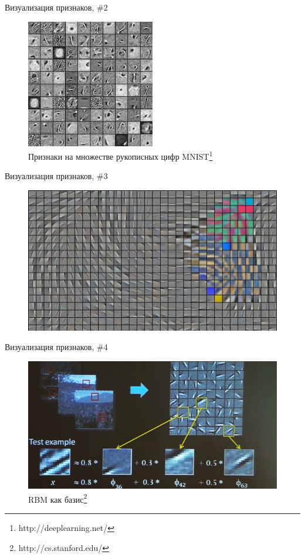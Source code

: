 \documentclass[10pt]{beamer}
\begin{document}
\begin{frame}{Визуализация признаков, \#2}

\begin{figure}[h!]
  \centering
  \includegraphics[width=0.5\textwidth]{images/feats3.png}
  \caption{Признаки на множестве рукописных цифр MNIST\footnote{http://deeplearning.net/}}
\end{figure}

\end{frame}


\begin{frame}{Визуализация признаков, \#3}
\begin{figure}[h!]
  \centering
  \includegraphics[width=1\textwidth]{images/feats4.png}
\end{figure}
\end{frame}


\begin{frame}{Визуализация признаков, \#4}
\begin{figure}[h!]
  \centering
  \includegraphics[width=1\textwidth]{images/feats5.png}
  \caption{RBM как базис\footnote{http://cs.stanford.edu/}}
\end{figure}
\end{frame}
\end{document}

